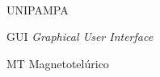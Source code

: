 \documentclass[csgeo,tcc, twoside]{unipampa}
\newcommand{\en}[1]{\textit{#1}}                                                %
\begin{document}
\newpage\
\begin{listofabbrv}{UNIPAMPA}
        \item[GUI]           {\en{Graphical User Interface}}
        \item[MT]            {Magnetotelúrico}
\end{listofabbrv}
\end{document}

